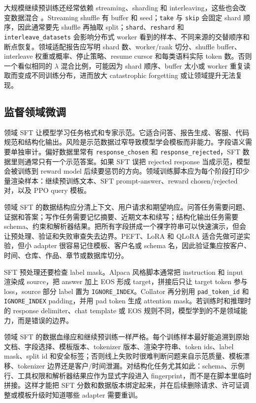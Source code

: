 \documentclass[UTF8,zihao=-4,openany]{ctexbook}
\begin{document}
大规模继续预训练还经常依赖 streaming、sharding 和 interleaving，这些也会改变数据混合 \cite{huggingface2026datasetsstream}。Streaming shuffle 有 buffer 和 seed；\texttt{take} 与 \texttt{skip} 会固定 shard 顺序，因此通常要先 shuffle 再抽取 split；\texttt{shard}、\texttt{reshard} 和 \texttt{interleave\_datasets} 会影响分布式 worker 看到的样本、不同来源的交替顺序和断点恢复。领域适配报告应写明 shard 数、worker/rank 切分、shuffle buffer、interleave 权重或概率、停止策略、resume cursor 和每类语料实际 token 数。否则一个看似相同的 $\lambda$ 混合比例，可能因为 shard 顺序、buffer 太小或 worker 重复读取而变成不同训练分布，进而放大 catastrophic forgetting 或让领域提升无法复现。

\subsection{监督领域微调}
领域 SFT 让模型学习任务格式和专家示范。它适合问答、报告生成、客服、代码规范和结构化输出。风险是示范数据过窄导致模型学会模板而非能力。字段语义需要单独审计。偏好数据里常有 \texttt{response\_chosen} 和 \texttt{response\_rejected}，SFT 数据里则通常只有一个示范答案。如果 SFT 误把 rejected response 当成示范，模型会被训练到 reward model 后续要惩罚的方向。领域训练脚本应为每个阶段打印少量渲染样本：继续预训练文本、SFT prompt-answer、reward chosen/rejected 对，以及 PPO query 模板。

领域 SFT 的数据结构应分清上下文、用户请求和期望响应。问答任务需要问题、证据和答案；写作任务需要记忆摘要、近期文本和续写；结构化输出任务需要 schema、约束和解析器结果。把所有字段拼成一个裸字符串可以快速演示，但会让预处理、验证和失败审查失去边界。PEFT、LoRA 和 QLoRA 适合先做可逆实验，但小 adapter 很容易记住模板、客户名或 schema 名，因此验证集应按客户、时间、仓库、作品、章节或数据库切分。

SFT 预处理还要检查 label mask。Alpaca 风格脚本通常把 instruction 和 input 渲染成 source，把 answer 加上 EOS 形成 target，拼接后只让 target token 参与 loss，source 部分 label 置为 \texttt{IGNORE\_INDEX}。Collator 再分别用 \texttt{pad\_token\_id} 和 \texttt{IGNORE\_INDEX} padding，并用 pad token 生成 attention mask。若训练时和推理时的 response delimiter、chat template 或 EOS 规则不同，模型学到的不是领域能力，而是错误的边界。

领域 SFT 的数据血缘应和继续预训练一样严格。每个训练样本最好能追溯到原始文档、字段选择、模板版本、tokenizer 版本、渲染字符串、token ids、label mask、split id 和安全标签；否则线上失败时很难判断问题来自示范质量、模板漂移、tokenizer 边界还是客户/时间泄漏。对结构化任务尤其如此：schema、示例行、工具权限和解析器结果应作为显式字段进入 fingerprint，而不是在脚本里临时拼接。这样才能把 SFT 分数和数据版本绑定起来，并在后续删除请求、许可证调整或模板升级时知道哪些 adapter 需要重训。
\end{document}
